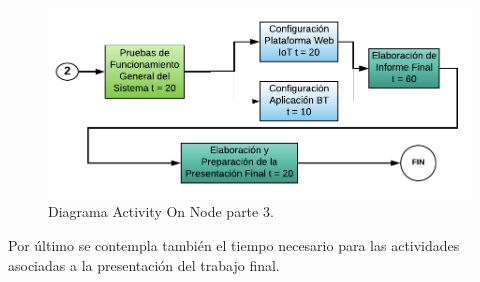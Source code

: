 \begin{figure}[h]
\centering
\includegraphics[width=\textwidth]{./Figures/activity_on_node_3.pdf}
\caption{Diagrama Activity On Node parte 3.}
\label{fig:activity_on_node_3}
\end{figure}

Por último se contempla también el tiempo necesario para las actividades asociadas a la presentación del trabajo final.

%


